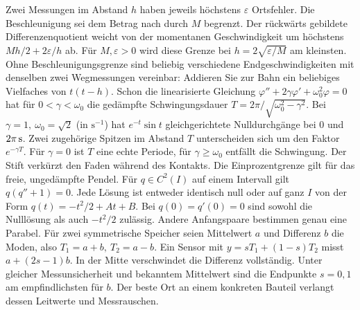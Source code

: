 Zwei Messungen im Abstand \(h\) haben jeweils höchstens \(\varepsilon\) Ortsfehler. Die Beschleunigung sei dem Betrag nach durch \(M\) begrenzt. Der rückwärts gebildete Differenzenquotient weicht von der momentanen Geschwindigkeit um höchstens \(Mh/2+2\varepsilon/h\) ab. Für \(M,\varepsilon>0\) wird diese Grenze bei \(h=2\sqrt{\varepsilon/M}\) am kleinsten. Ohne Beschleunigungsgrenze sind beliebig verschiedene Endgeschwindigkeiten mit denselben zwei Wegmessungen vereinbar: Addieren Sie zur Bahn ein beliebiges Vielfaches von \(t(t-h)\).
Schon die linearisierte Gleichung \(\varphi''+2\gamma\varphi'+\omega_0^2\varphi=0\) hat für \(0<\gamma<\omega_0\) die gedämpfte Schwingungsdauer \(T=2\pi/\sqrt{\omega_0^2-\gamma^2}\). Bei \(\gamma=1,\ \omega_0=\sqrt2\) (in \(\mathrm{s^{-1}}\)) hat \(e^{-t}\sin t\) gleichgerichtete Nulldurchgänge bei 0 und \(2\pi\,\mathrm{s}\). Zwei zugehörige Spitzen im Abstand \(T\) unterscheiden sich um den Faktor \(e^{-\gamma T}\). Für \(\gamma=0\) ist \(T\) eine echte Periode, für \(\gamma\ge\omega_0\) entfällt die Schwingung. Der Stift verkürzt den Faden während des Kontakts. Die Einprozentgrenze gilt für das freie, ungedämpfte Pendel.
Für \(q\in C^2(I)\) auf einem Intervall gilt \(q(q''+1)=0\). Jede Lösung ist entweder identisch null oder auf ganz \(I\) von der Form \(q(t)=-t^2/2+At+B\).
Bei \(q(0)=q'(0)=0\) sind sowohl die Nulllösung als auch \(-t^2/2\) zulässig. Andere Anfangspaare bestimmen genau eine Parabel.
Für zwei symmetrische Speicher seien Mittelwert \(a\) und Differenz \(b\) die Moden, also \(T_1=a+b,\ T_2=a-b\). Ein Sensor mit \(y=sT_1+(1-s)T_2\) misst \(a+(2s-1)b\). In der Mitte verschwindet die Differenz vollständig. Unter gleicher Messunsicherheit und bekanntem Mittelwert sind die Endpunkte \(s=0,1\) am empfindlichsten für \(b\). Der beste Ort an einem konkreten Bauteil verlangt dessen Leitwerte und Messrauschen.

